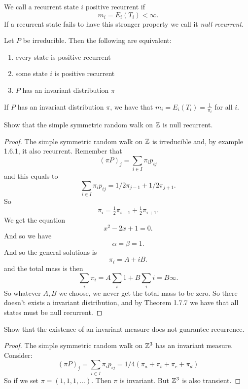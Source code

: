 \begin{defn}
We call a recurrent state \(i\) positive recurrent if
\[
m_{i}=E_{i}(T_{i})<\infty .
\]
If a recurrent state fails to have this stronger property we call it \emph{null recurrent}.
\end{defn}

\begin{thm}[Theorem 1.7.7]
Let \(P\) be irreducible. Then the following are equivalent:

\begin{enumerate}
  \item every state is positive recurrent
  \item some state \(i\) is positive recurrent
  \item \(P\) has an invariant distribution \(\pi \)
\end{enumerate}

\end{thm}

\begin{thm}
If \(P\) has an invariant distribution \(\pi \), we have that \(m_{i}=E_{i}(T_{i})=\frac{1}{\pi _{i}}\) for all \(i\).
\end{thm}

\begin{thm}[Example 1.7.8]
Show that the simple symmetric random walk on \(\Bbb{Z}\) is null recurrent.
\end{thm}

\begin{proof}
The simple symmetric random walk on \(\Bbb{Z}\) is irreducible and, by example 1.6.1, it also recurrent.  Remember that
\[
(\pi P)_{j}=\sum _{i\in I}\pi _{i}p_{ij}
\]
and this equals to
\[
\sum _{i\in I}\pi _{i}p_{ij}=1/2 \pi _{j-1}+1/2\pi _{j+1}.
\]
So
\[
\pi _{i}=\tfrac{1}{2}\pi _{i-1}+\tfrac{1}{2}\pi _{i+1}.
\]
We get the equation
\[
x^2-2x+1=0.
\]
And so we have
\[
\alpha =\beta =1.
\]
And so the general solutions is
\[
\pi _{i}=A+iB.
\]
and the total mass is then
\[
\sum _{i}\pi _{i}=A\sum _{i}1+B\sum _{i}i=B\infty .
\]
So whatever \(A,B\) we choose, we never get the total mass to be zero. So there doesn't exists a invariant distribution, and by Theorem 1.7.7 we have that all states must be null recurrent.
\end{proof}
\newpage
\begin{thm}[Example 1.7.9]
Show that the existence of an invariant measure does not guarantee recurrence.
\end{thm}

\begin{proof}
The simple symmetric random walk on \(\Bbb{Z}^{3}\) has an invariant measure. Consider:
\[
(\pi P)_{j}=\sum _{i\in I}\pi _{i}p_{ij}=1/4(\pi _{a}+\pi _{b}+\pi _{c}+\pi _{d})
\]
So if we set \(\pi =(1,1,1,\ldots )\). Then \(\pi \) is invariant. But \(\Bbb{Z}^{3}\) is also transient.
\end{proof}

